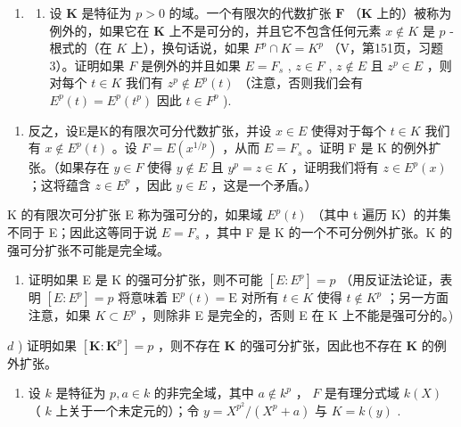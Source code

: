 \BourbakiExerciseGroup

\begin{enumerate}
\def\labelenumi{\arabic{enumi})}
\tightlist
\item
  \begin{enumerate}
  \def\labelenumii{\alph{enumii})}
  \tightlist
  \item
    设 \(\mathbf{K}\) 是特征为 \(p > 0\) 的域。一个有限次的代数扩张 \(\mathbf{F}\) （\(\mathbf{K}\) 上的）被称为例外的，如果它在 \(\mathbf{K}\) 上不是可分的，并且它不包含任何元素 \(x \notin K\) 是 \(p\) -根式的（在 \(K\) 上），换句话说，如果 \(F^p \cap K = K^p\) （V，第151页，习题3）。证明如果 \(F\) 是例外的并且如果 \(E = F_s\) , \(z \in F\) , \(z \notin E\) 且 \(z^p \in E\) ，则对每个 \(t \in K\) 我们有 \(z^p \notin E^p(t)\) （注意，否则我们会有 \(E^p(t) = E^p(t^p)\) 因此 \(t \in F^p\) ).
  \end{enumerate}
\end{enumerate}

\begin{enumerate}
\def\labelenumi{\alph{enumi})}
\setcounter{enumi}{1}
\tightlist
\item
  反之，设E是K的有限次可分代数扩张，并设 \(x \in E\) 使得对于每个 \(t \in K\) 我们有 \(x \notin E^p(t)\) 。设 \(F = E(x^{1/p})\) ，从而 \(E = F_s\) 。证明 F 是 K 的例外扩张。（如果存在 \(y \in F\) 使得 \(y \notin E\) 且 \(y^p = z \in K\) ，证明我们将有 \(z \in E^p(x)\) ；这将蕴含 \(z \in E^p\) ，因此 \(y \in E\) ，这是一个矛盾。）
\end{enumerate}

K 的有限次可分扩张 E 称为强可分的，如果域 \(E^{p}(t)\) （其中 t 遍历 K）的并集不同于 E；因此这等同于说 \(E = F_{s}\) ，其中 F 是 K 的一个不可分例外扩张。K 的强可分扩张不可能是完全域。

\begin{enumerate}
\def\labelenumi{\alph{enumi})}
\setcounter{enumi}{2}
\tightlist
\item
  证明如果 E 是 K 的强可分扩张，则不可能 \([E:E^{p}]=p\) （用反证法论证，表明 \([E:E^{p}]=p\) 将意味着 \(\mathrm{E}^{p}(t)=\mathrm{E}\) 对所有 \(t\in K\) 使得 \(t\notin K^{p}\) ；另一方面注意，如果 \(K\subset E^{p}\) ，则除非 E 是完全的，否则 E 在 K 上不能是强可分的。)
\end{enumerate}

\(d\) ) 证明如果 \([\mathbf{K}:\mathbf{K}^p ] = p\) ，则不存在 \(\mathbf{K}\) 的强可分扩张，因此也不存在 \(\mathbf{K}\) 的例外扩张。

\begin{enumerate}
\def\labelenumi{\arabic{enumi})}
\setcounter{enumi}{1}
\tightlist
\item
  设 \(k\) 是特征为 \(p, a \in k\) 的非完全域，其中 \(a \notin k^p\) ， \(F\) 是有理分式域 \(k(X)\) （ \(k\) 上关于一个未定元的）；令 \(y = X^{p^2} / (X^p + a)\) 与 \(K = k(y)\) .
\end{enumerate}

